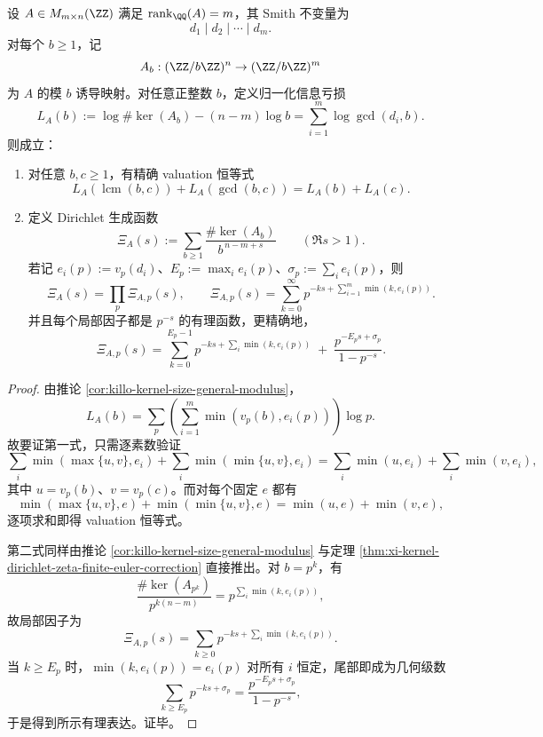 \begin{theorem}\label{thm:xi-kernel-loss-divisibility-valuation-rational-euler}
设 \(A\in M_{m\times n}(\ZZ)\) 满足 \(\operatorname{rank}_{\QQ}(A)=m\)，其 Smith 不变量为
\[
d_1\mid d_2\mid\cdots\mid d_m.
\]
对每个 \(b\ge 1\)，记
\[
A_b:(\ZZ/b\ZZ)^n\to(\ZZ/b\ZZ)^m
\]
为 \(A\) 的模 \(b\) 诱导映射。对任意正整数 \(b\)，定义归一化信息亏损
\[
L_A(b):=
\log \#\ker(A_b)-(n-m)\log b
=
\sum_{i=1}^{m}\log \gcd(d_i,b).
\]
则成立：
\begin{enumerate}
\item 对任意 \(b,c\ge 1\)，有精确 valuation 恒等式
\[
\boxed{\;
L_A(\operatorname{lcm}(b,c))+L_A(\gcd(b,c))
=
L_A(b)+L_A(c).\;}
\]
\item 定义 Dirichlet 生成函数
\[
\Xi_A(s):=\sum_{b\ge 1}\frac{\#\ker(A_b)}{b^{\,n-m+s}}
\qquad(\Re s>1).
\]
若记 \(e_i(p):=v_p(d_i)\)、\(E_p:=\max_i e_i(p)\)、\(\sigma_p:=\sum_i e_i(p)\)，则
\[
\boxed{\;
\Xi_A(s)=\prod_{p}\Xi_{A,p}(s),\qquad
\Xi_{A,p}(s)=\sum_{k=0}^{\infty}p^{-ks+\sum_{i=1}^{m}\min(k,e_i(p))}.\;}
\]
并且每个局部因子都是 \(p^{-s}\) 的有理函数，更精确地，
\[
\boxed{\;
\Xi_{A,p}(s)
=
\sum_{k=0}^{E_p-1}p^{-ks+\sum_i\min(k,e_i(p))}
\;+\;
\frac{p^{-E_p s+\sigma_p}}{1-p^{-s}}.\;}
\]
\end{enumerate}
\end{theorem}
\begin{proof}
由推论 \ref{cor:killo-kernel-size-general-modulus}，
\[
L_A(b)=\sum_{p}\left(\sum_{i=1}^{m}\min(v_p(b),e_i(p))\right)\log p.
\]
故要证第一式，只需逐素数验证
\[
\sum_i \min(\max\{u,v\},e_i)+\sum_i \min(\min\{u,v\},e_i)
=
\sum_i \min(u,e_i)+\sum_i \min(v,e_i),
\]
其中 \(u=v_p(b)\)、\(v=v_p(c)\)。而对每个固定 \(e\) 都有
\[
\min(\max\{u,v\},e)+\min(\min\{u,v\},e)=\min(u,e)+\min(v,e),
\]
逐项求和即得 valuation 恒等式。

第二式同样由推论 \ref{cor:killo-kernel-size-general-modulus} 与定理 \ref{thm:xi-kernel-dirichlet-zeta-finite-euler-correction} 直接推出。对 \(b=p^k\)，有
\[
\frac{\#\ker(A_{p^k})}{p^{k(n-m)}}
=
p^{\sum_i\min(k,e_i(p))},
\]
故局部因子为
\[
\Xi_{A,p}(s)=\sum_{k\ge 0}p^{-ks+\sum_i\min(k,e_i(p))}.
\]
当 \(k\ge E_p\) 时，\(\min(k,e_i(p))=e_i(p)\) 对所有 \(i\) 恒定，尾部即成为几何级数
\[
\sum_{k\ge E_p}p^{-ks+\sigma_p}
=
\frac{p^{-E_p s+\sigma_p}}{1-p^{-s}},
\]
于是得到所示有理表达。证毕。
\end{proof}

